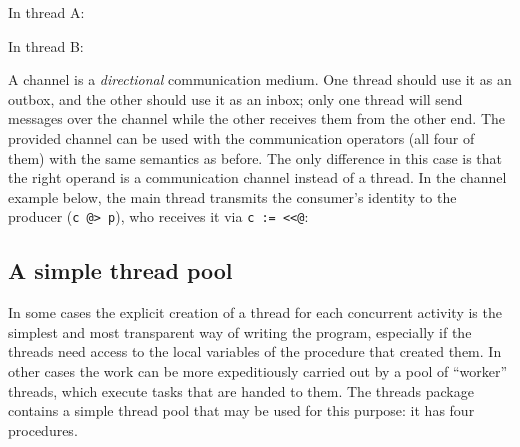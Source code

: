 In thread A:


In thread B:


A channel is a \emph{directional} communication medium.  One thread should use
it as an outbox, and the other should use it as an inbox; only one thread will
send messages over the channel while the other receives them from the other
end. The provided channel can be used with the communication operators (all four
of them) with the same semantics as before. The only difference in this case is
that the right operand is a communication channel instead of a thread.  In the
channel example below, the main thread transmits the consumer's identity to the
producer (\texttt{c @> p}), who receives it via \texttt{c := <{}<@}:


\subsection*{A simple thread pool}
\label{SimpleThreadPool}
In some cases the explicit creation of a thread for each concurrent activity is
the simplest and most transparent way of writing the program, especially if the
threads need access to the local variables of the procedure that created them.
In other cases the work can be more expeditiously carried out by a pool of
``worker'' threads, which execute tasks that are handed to them.  The threads
package contains a simple thread pool that may be used for this purpose: it has
four procedures.

